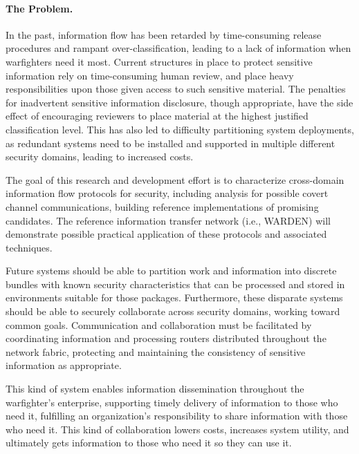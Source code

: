 \documentclass{sbir}
\begin{document}
\paragraph{The Problem.} In the past, information flow has been retarded by time-consuming release procedures and rampant over-classification, leading to a lack of information when warfighters need it most. Current structures in place to protect sensitive information rely on time-consuming human review, and place heavy responsibilities upon those given access to such sensitive material. The penalties for inadvertent sensitive information disclosure, though appropriate, have the side effect of encouraging reviewers to place material at the highest justified classification level. This has also led to difficulty partitioning system deployments, as redundant systems need to be installed and supported in multiple different security domains, leading to increased costs.

The goal of this research and development effort is to characterize cross-domain information flow protocols for security, including analysis for possible covert channel communications, building reference implementations of promising candidates. The reference information transfer network (i.e., WARDEN) will demonstrate possible practical application of these protocols and associated techniques. 

Future systems should be able to partition work and information into discrete bundles with known security characteristics that can be processed and stored in environments suitable for those packages. Furthermore, these disparate systems should be able to securely collaborate across security domains, working toward common goals. Communication and collaboration must be facilitated by coordinating information and processing routers distributed throughout the network fabric, protecting and maintaining the consistency of sensitive information as appropriate.

This kind of system enables information dissemination throughout the warfighter's enterprise, supporting timely delivery of information to those who need it, fulfilling an organization's responsibility to share information with those who need it. This kind of collaboration lowers costs, increases system utility, and ultimately gets information to those who need it so they can use it.
\clearpage
{}
\end{document}
